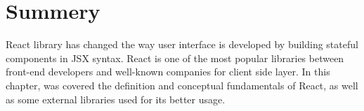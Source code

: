 \section{Summery}

React library has changed the way user interface is developed by building stateful components in JSX syntax. React is one of the most popular libraries between front-end developers and well-known companies for client side layer. In this chapter, was covered the definition and conceptual fundamentals of React, as well as some external libraries used for its better usage. \par

